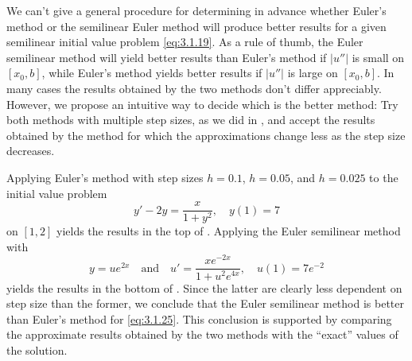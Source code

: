 We can't give a general procedure for determining in advance
whether Euler's method or the semilinear Euler method will produce
better results for a given semilinear initial value problem
\eqref{eq:3.1.19}.
 As a rule of thumb, the Euler semilinear method will
yield better results than Euler's method if $|u''|$ is small on
$[x_0,b]$, while Euler's method  yields better results if $|u''|$
is large on $[x_0,b]$.
 In many cases the results obtained by the two methods don't
 differ appreciably. However, we propose an intuitive
way to decide which is the better method: Try both methods with
multiple step sizes, as we did in ,
 and accept the results obtained by the method for
which the approximations change less as the step size decreases.

\begin{example}\label{example:3.1.5}
Applying Euler's method with step sizes $h=0.1$, $h=0.05$, and
$h=0.025$ to the initial value problem
\begin{equation}\label{eq:3.1.25}
y'-2y=\frac{x}{1+y^2},\quad y(1)=7
\end{equation}
on $[1,2]$ yields the results in the top of
. Applying the Euler semilinear method
with
\[
y=ue^{2x}\quad\text{and}\quad u'=\frac{xe^{-2x}}{1+u^2e^{4x}},\quad
u(1)=7e^{-2}
\]
 yields the results in the bottom of .
Since the latter are clearly less dependent on step size
than the former, we conclude that the Euler semilinear method
is better than Euler's method for \eqref{eq:3.1.25}. This conclusion
is supported by comparing the approximate results obtained by the
two methods with the ``exact'' values of the solution.
\end{example}



